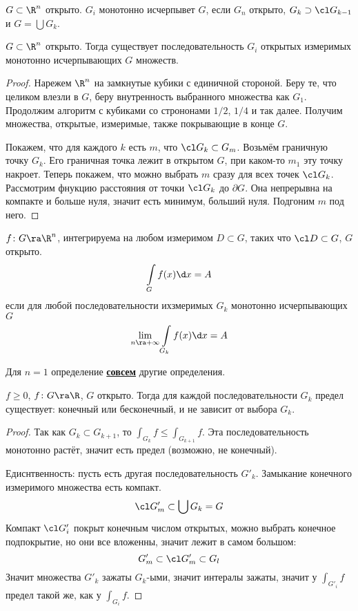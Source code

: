 \begin{Def}
	$G \subset \R^n$ открыто.
	${G_i}$ монотонно исчерпывет $G$, если $G_n$ открыто, $G_k \supset \cl G_{k-1}$ и $G = \bigcup G_k$.
\end{Def}

\begin{theorem}
	$G \subset \R^n$ открыто.
	Тогда существует последовательность $G_i$ открытых измеримых монотонно исчерпывающих $G$ множеств.
\end{theorem}

\begin{proof}
	Нарежем $\R^n$ на замкнутые кубики с единичной стороной.
	Беру те, что целиком влезли в $G$, беру внутренность выбранного множества как $G_1$.
	Продолжим алгоритм с кубиками со стрононами $1/2$, $1/4$ и так далее.
	Получим множества, открытые, измеримые, также покрывающие в конце $G$.

	Покажем, что для каждого $k$ есть $m$, что $\cl G_k \subset G_m$.
	Возьмём граничную точку $G_k$. Его граничная точка лежит в открытом $G$, при каком-то $m_1$ эту точку накроет.
	Теперь покажем, что можно выбрать $m$ сразу для всех точек $\cl G_k$.
	Рассмотрим фнукцию расстояния от точки $\cl G_k$ до $\partial G$.
	Она непрерывна на компакте и больше нуля, значит есть минимум, больший нуля.
	Подгоним $m$ под него.
\end{proof}

\begin{Def}
	$f\colon G \ra \R^n$, интегрируема на любом измеримом $D \subset G$, таких что $\cl D \subset G$, $G$ открыто.
	\[ \int\limits_G f(x) \d x = A \]
	если для любой последовательности ихзмеримых $G_k$ монотонно исчерпывающих $G$
	\[ \lim_{n\ra+\infty} \int\limits_{G_k} f(x) \d x = A \]
\end{Def}
\begin{Rem}
	Для $n = 1$ определение \underline{\bf совсем} другие определения.
\end{Rem}

\begin{theorem}
	$f \ge 0$, $f\colon G \ra \R$, $G$ открыто.
	Тогда для каждой последовательности $G_k$ предел существует: конечный или бесконечный, и не зависит от выбора $G_k$.
\end{theorem}
\begin{proof}
	Так как $G_k \subset G_{k+1}$, то $\int_{G_k} f \le \int_{G_{k+1}} f$.
	Эта последовательность монотонно растёт, значит есть предел (возможно, не конечный).

	Едиснтвенность: пусть есть другая последовательность $G'_k$.
	Замыкание конечного измеримого множества есть компакт.
	\[ \cl G'_m \subset \bigcup G_k = G \]
	Компакт $\cl G'_i$ покрыт конечным числом открытых, можно выбрать конечное подпокрытие, но они все вложенны, значит лежит в самом большом:
	\[ G'_m \subset \cl G'_m \subset G_l \]
	Значит множества $G'_k$ зажаты $G_k$-ыми, значит интералы зажаты, значит у $\int_{G'_i} f$ предел такой же, как у $\int_{G_i} f$.
\end{proof}


